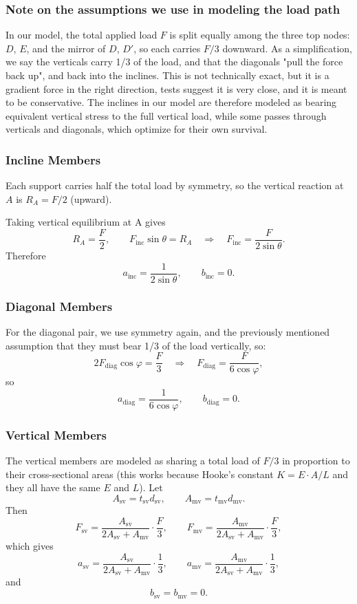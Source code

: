 \documentclass[11pt]{article}
\begin{document}
\subsubsection{Note on the assumptions we use in modeling the load path}
In our model, the total applied load $F$ is split equally among the three top nodes: $D$, $E$, and the mirror of $D$, $D'$, so each carries $F/3$ downward. As a simplification, we say the verticals carry 1/3 of the load, and that the diagonals "pull the force back up", and back into the inclines. This is not technically exact, but it is a gradient force in the right direction, tests suggest it is very close, and it is meant to be conservative. The inclines in our model are therefore modeled as bearing equivalent vertical stress to the full vertical load, while some passes through verticals and diagonals, which optimize for their own survival.  

\medskip
\subsubsection{Incline Members}

Each support carries half the total load by symmetry, so the vertical reaction at $A$ is $R_A = F/2$ (upward).

Taking vertical equilibrium at A gives
\[
R_A = \frac{F}{2}, \qquad
F_\text{inc}\sin\theta = R_A
\quad\Rightarrow\quad
F_\text{inc} = \frac{F}{2\sin\theta}.
\]
Therefore
\[
\boxed{a_\text{inc} = \frac{1}{2\sin\theta}, \qquad b_\text{inc} = 0.}
\]

\subsubsection{Diagonal Members}

For the diagonal pair, we use symmetry again, and the previously mentioned assumption that they must bear 1/3 of the load vertically, so:
\[
2F_\text{diag}\cos\varphi = \frac{F}{3}
\quad\Rightarrow\quad
F_\text{diag} = \frac{F}{6\cos\varphi},
\]
so
\[
\boxed{a_\text{diag} = \frac{1}{6\cos\varphi}, \qquad b_\text{diag} = 0.}
\]

\subsubsection{Vertical Members}

The vertical members are modeled as sharing a total load of $F/3$ in proportion to their
cross-sectional areas (this works because Hooke's constant $K = E \cdot A/L$ and they all have the same $E$ and $L$). Let
\[
A_\text{sv} = t_\text{sv}d_\text{sv}, \qquad A_\text{mv} = t_\text{mv}d_\text{mv}.
\]
Then
\[
F_\text{sv} = \frac{A_\text{sv}}{2A_\text{sv} + A_\text{mv}}\cdot\frac{F}{3}, \qquad
F_\text{mv} = \frac{A_\text{mv}}{2A_\text{sv} + A_\text{mv}}\cdot\frac{F}{3},
\]
which gives
\[
\boxed{a_\text{sv} = \frac{A_\text{sv}}{2A_\text{sv} + A_\text{mv}}\cdot\frac{1}{3}, \qquad
a_\text{mv} = \frac{A_\text{mv}}{2A_\text{sv} + A_\text{mv}}\cdot\frac{1}{3},}
\]
and
\[
\boxed{b_\text{sv} = b_\text{mv} = 0.}
\]
\end{document}
